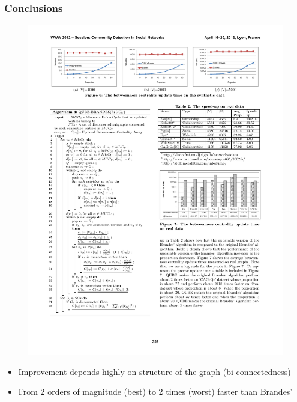 \begin{frame}
  \frametitle{Conclusions}

  \begin{figure}[t]
    \centering
    \includegraphics[width=\textwidth, height=0.6\textheight, keepaspectratio]{imgs/qube-results2}
  \end{figure}
  
  \begin{itemize}
    \item Improvement depends highly on structure of the graph (bi-connectedness)
    \item From 2 orders of magnitude (best) to 2 times (worst) faster than Brandes'
  \end{itemize}
    
\end{frame}